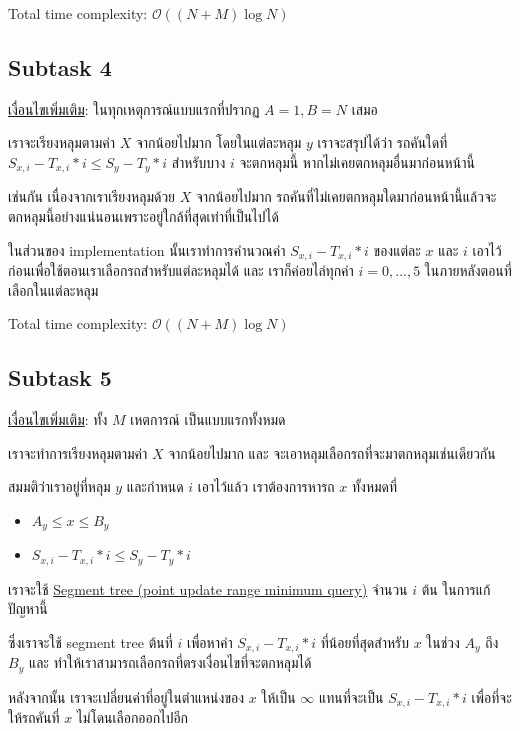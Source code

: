 \documentclass[12pt]{article}
\begin{document}
Total time complexity: $\mathcal{O}((N + M)\log N)$

\newpage
\subsection{Subtask 4}

\underline{เงื่อนไขเพิ่มเติม}: ในทุกเหตุการณ์แบบแรกที่ปรากฏ $A = 1, B = N$ เสมอ

เราจะเรียงหลุมตามค่า $X$ จากน้อยไปมาก โดยในแต่ละหลุม $y$ เราจะสรุปได้ว่า รถคันใดที่ $S_{x,i} - T_{x,i} * i \leq S_y - T_y * i$ สำหรับบาง $i$ จะตกหลุมนี้ หากไม่เคยตกหลุมอื่นมาก่อนหน้านี้

เช่นกัน เนื่องจากเราเรียงหลุมด้วย $X$ จากน้อยไปมาก รถคันที่ไม่เคยตกหลุมใดมาก่อนหน้านี้แล้วจะตกหลุมนี้อย่างแน่นอนเพราะอยู่ใกล้ที่สุดเท่าที่เป็นไปได้

ในส่วนของ implementation นั้นเราทำการคำนวณค่า $S_{x,i} - T_{x,i} * i$ ของแต่ละ $x$ และ $i$ เอาไว้ก่อนเพื่อใช้ตอนเราเลือกรถสำหรับแต่ละหลุมได้ และ เราก็ค่อยไล่ทุกค่า $i = 0,...,5$ ในภายหลังตอนที่เลือกในแต่ละหลุม

Total time complexity: $\mathcal{O}((N+M)\log N)$

\subsection{Subtask 5}

\underline{เงื่อนไขเพิ่มเติม}: ทั้ง $M$ เหตการณ์ เป็นแบบแรกทั้งหมด

เราจะทำการเรียงหลุมตามค่า $X$ จากน้อยไปมาก และ จะเอาหลุมเลือกรถที่จะมาตกหลุมเช่นเดียวกัน

สมมติว่าเราอยู่ที่หลุม $y$ และกำหนด $i$ เอาไว้แล้ว เราต้องการหารถ $x$ ทั้งหมดที่

\begin{itemize}
  \item $A_y \leq x \leq B_y$
  \item $S_{x,i} - T_{x, i} * i \leq S_y - T_y * i$
\end{itemize}

เราจะใช้ \href{https://cp-algorithms.com/data_structures/segment_tree.html}{Segment tree (point update range minimum query)} จำนวน $i$ ต้น ในการแก้ปัญหานี้ 

ซึ่งเราจะใช้ segment tree ต้นที่ $i$ เพื่อหาค่า $S_{x,i} - T_{x,i} * i$ ที่น้อยที่สุดสำหรับ $x$ ในช่วง $A_y$ ถึง $B_y$  และ ทำให้เราสามารถเลือกรถที่ตรงเงื่อนไขที่จะตกหลุมได้

หลังจากนั้น เราจะเปลี่ยนค่าที่อยู่ในตำแหน่งของ $x$ ให้เป็น $\infty$ แทนที่จะเป็น $S_{x,i} - T_{x,i} * i$ เพื่อที่จะให้รถคันที่ $x$ ไม่โดนเลือกออกไปอีก
\end{document}
